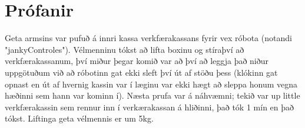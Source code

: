 \section{Prófanir}
Geta armsins var pufuð á innri kassa verkfærakassans fyrir vex róbota (notandi "jankyControles"). Vélmenninu tókst að lifta boxinu og stíraþví að verkfærakassanum, því miður þegar komið var að því að leggja það niður uppgötuðum við að róbotinn gat ekki sleft því út af stöðu þess (klókinn gat opnast en út af hvernig kassin var í læginu var ekki hægt að sleppa honum vegna hæðinni sem hann var kominn í). Næsta prufa var á náhvæmni; tekið var up little verkfærakassin sem rennur inn í verkærakassan á hliðinni, það tók 1 mín en það tókst.
Liftinga geta vélmennis er um 5kg.

